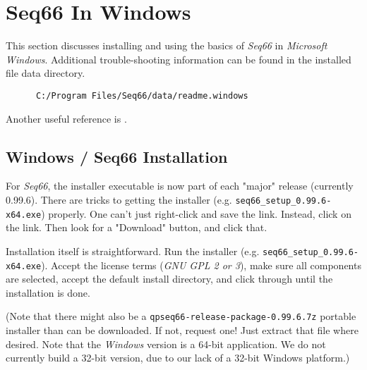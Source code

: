 %
%
%

\section{Seq66 In Windows}
\label{sec:windows}

   This section discusses installing and using the basics of \textsl{Seq66}
   in \textsl{Microsoft Windows}.  Additional trouble-shooting information can
   be found in the installed file data directory.

   \begin{verbatim}
      C:/Program Files/Seq66/data/readme.windows
   \end{verbatim}

   Another useful reference is \cite{windowsmidi}.

\subsection{Windows / Seq66 Installation}
\label{subsec:windows_seq66_installation}

   For \textsl{Seq66}, the installer executable is now part of
   each "major" release (currently 0.99.6).
   There are tricks to getting the installer
   (e.g. \texttt{seq66\_setup\_0.99.6-x64.exe}) properly. 
   One can't just right-click and save the link.
   Instead, click on the link.  Then look for a "Download" button, and
   click that.

   Installation itself is straightforward.  Run the installer (e.g.
   \texttt{seq66\_setup\_0.99.6-x64.exe}).  Accept the license terms
   (\textsl{GNU GPL 2 or 3}),
   make sure all components are selected, accept the default
   install directory, and click through until the installation is done.

   (Note that there might also be a
   \texttt{qpseq66-release-package-0.99.6.7z} portable installer
   than can be downloaded.
   If not, request one!
   Just extract that file where desired.
   Note that the \textsl{Windows} version is a 64-bit
   application. We do not currently build a 32-bit version, due to
   our lack of a 32-bit Windows platform.)

